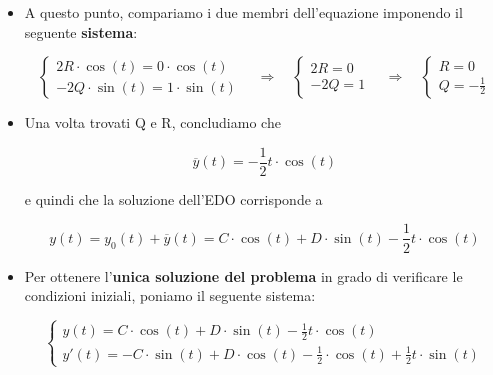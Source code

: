 \documentclass[a4paper, 12pt]{report}
\begin{document}
\begin{itemize}
\begin{itemize}
            \[ [2R-Qt]\cos(t)-[2Q+Rt]\sin(t) +  t[Q \cdot \cos(t) + R \cdot \sin(t)] = \sin(t)\]
            
            \[ 2R \cdot \cos(t) - 2Q \cdot \sin(t) = \sin(t)\]
            
            \item A questo punto, compariamo i due membri dell'equazione imponendo il seguente \textbf{sistema}:
            
            $$ 
            \left \{ \begin{array}{l}
                2R \cdot \cos(t) = 0 \cdot \cos(t) \\
                -2Q \cdot \sin(t) = 1 \cdot \sin(t)
            \end{array}\right .
            \quad \Longrightarrow \quad
            \left \{ \begin{array}{l}
                2R = 0 \\
                -2Q = 1
            \end{array}\right .
            \quad \Longrightarrow \quad
            \left \{ \begin{array}{l}
                R = 0 \\
                Q = -\frac{1}{2}
            \end{array}\right .
            $$
            
            \item Una volta trovati Q e R, concludiamo che
            
            \[ \overline{y}(t) = -\frac{1}{2}t \cdot \cos(t)\]
            
            e quindi che la soluzione dell'EDO corrisponde a
            
            \[ y(t) = y_0(t) + \overline{y}(t) = C \cdot \cos(t) + D \cdot \sin(t) -\frac{1}{2}t \cdot \cos(t) \]
            
            \item Per ottenere l'\textbf{unica soluzione del problema} in grado di verificare le condizioni iniziali, poniamo il seguente sistema:
            
            $$ 
            \left \{ \begin{array}{l}
                y(t) = C \cdot \cos(t) + D \cdot \sin(t) -\frac{1}{2}t \cdot \cos(t)\\
                y'(t) = -C \cdot \sin(t) + D \cdot \cos(t) -\frac{1}{2} \cdot \cos(t) + \frac{1}{2}t \cdot \sin(t)
            \end{array}\right .
            $$ 
            

\end{itemize}
\end{itemize}
\end{document}
